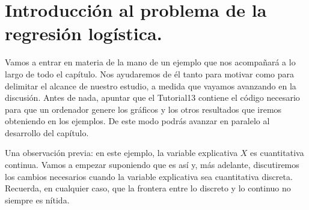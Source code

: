 \section{Introducción al problema de la regresión logística.}
\label{cap13:sec:IntroduccionProblemaRegresionLogistica}

Vamos a entrar en materia de la mano de un ejemplo que nos acompañará a lo largo de todo el capítulo. Nos ayudaremos de él tanto para motivar como para delimitar el alcance de nuestro estudio, a medida que vayamos avanzando en la discusión. Antes de nada, apuntar que el Tutorial13 contiene el código necesario para que un ordenador genere los gráficos y los otros resultados que iremos obteniendo en los ejemplos. De este modo podrás avanzar en paralelo al desarrollo del capítulo.

Una observación previa: en este ejemplo, la variable explicativa $X$ es cuantitativa continua. Vamos a empezar suponiendo que es así y, más adelante, discutiremos los cambios necesarios cuando la variable explicativa sea cuantitativa discreta. Recuerda, en cualquier caso, que la frontera entre lo discreto y lo continuo no siempre es  nítida.
